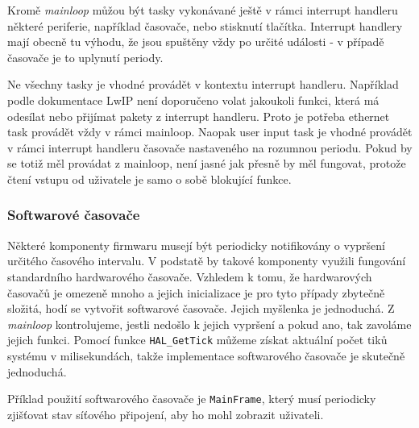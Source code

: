 Kromě \emph{mainloop} můžou být tasky vykonávané ještě v rámci interrupt handleru některé
periferie, například časovače, nebo stisknutí tlačítka.
Interrupt handlery mají obecně tu výhodu, že jsou spuštěny vždy po určité události -
v případě časovače je to uplynutí periody.

Ne všechny tasky je vhodné provádět v kontextu interrupt handleru.
Například podle dokumentace LwIP není doporučeno volat jakoukoli funkci, která má odesílat
nebo přijímat pakety z interrupt handleru.
Proto je potřeba ethernet task provádět vždy v rámci mainloop.
Naopak user input task je vhodné provádět v rámci interrupt handleru časovače nastaveného
na rozumnou periodu.
Pokud by se totiž měl provádat z mainloop, není jasné jak přesně by měl fungovat, protože čtení
vstupu od uživatele je samo o sobě blokující funkce.

\subsubsection{Softwarové časovače}
Některé komponenty firmwaru musejí být periodicky notifikovány o vypršení určitého časového intervalu.
V podstatě by takové komponenty využili fungování standardního hardwarového časovače.
Vzhledem k tomu, že hardwarových časovačů je omezeně mnoho a jejich inicializace je pro tyto případy zbytečně složitá,
hodí se vytvořit softwarové časovače.
Jejich myšlenka je jednoduchá.
Z \emph{mainloop} kontrolujeme, jestli nedošlo k jejich vypršení a pokud ano, tak zavoláme jejich
 funkci.
Pomocí funkce \texttt{HAL\_GetTick} můžeme získat aktuální počet tiků systému v milisekundách, takže
implementace softwarového časovače je skutečně jednoduchá.

Příklad použití softwarového časovače je \texttt{MainFrame}, který musí periodicky zjišťovat stav síťového
připojení, aby ho mohl zobrazit uživateli.


